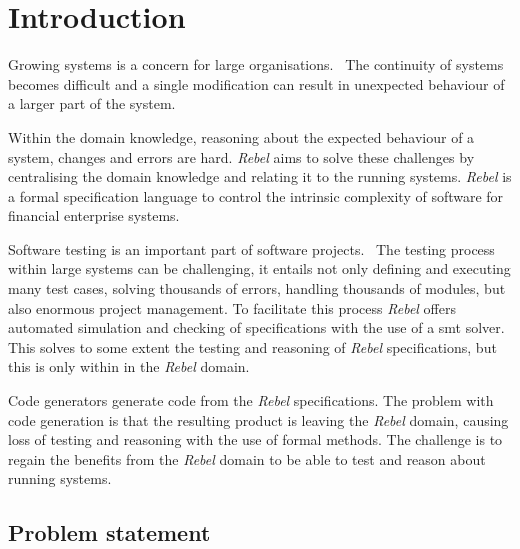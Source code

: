 \chapter{Introduction}

Growing systems is a concern for large
organisations.~\cite[p.~1]{stoel_storm_vinju_bosman_2016} The continuity of
systems becomes difficult and a single modification can result in unexpected
behaviour of a larger part of the system.

Within the domain knowledge, reasoning about the expected behaviour of a system,
changes and errors are hard. \textit{Rebel} aims to solve these challenges by centralising the domain knowledge and relating
it to the running systems. \textit{Rebel} is a formal specification language to
control the intrinsic complexity of software for financial
enterprise systems.~\cite[p.~1]{stoel_storm_vinju_bosman_2016}

Software testing is an important part of software projects.~\cite[p.~4]{myers2011art} The testing
process within large systems can be challenging, it entails not only defining
and executing many test cases, solving thousands of errors, handling
thousands of modules, but also enormous project management. To facilitate this
process \textit{Rebel} offers automated simulation and checking of specifications with
the use of a \gls{smt} solver. This solves to some
extent the testing and reasoning of \textit{Rebel} specifications, but this is only
within in the \textit{Rebel} domain.

Code generators generate code from the \textit{Rebel} specifications. The problem with code generation is that the resulting
product is leaving the \textit{Rebel} domain, causing loss of testing and reasoning with
the use of formal methods. The challenge is to regain the benefits from the
\textit{Rebel} domain to be able to test and reason about running systems.

\section{Problem statement}\label{sec:problem-statement}



